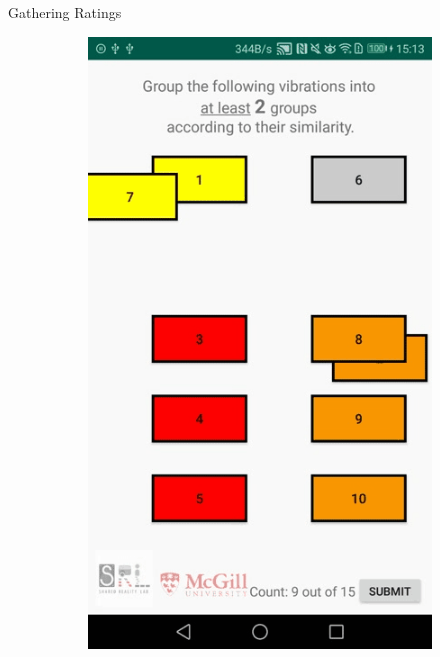 \begin{frame}{Gathering Ratings}
\begin{figure}[!htb]
\begin{subfigure}{.24\textwidth}
  \centering
    \label{fig:app_process_grouping_2}
  \includegraphics[width=\linewidth]{Images/2.png}
\end{subfigure}
\begin{subfigure}{.24\textwidth}
  \label{fig:app_process_grouping_3}
  \centering

\end{subfigure}
\end{figure}
\end{frame}
